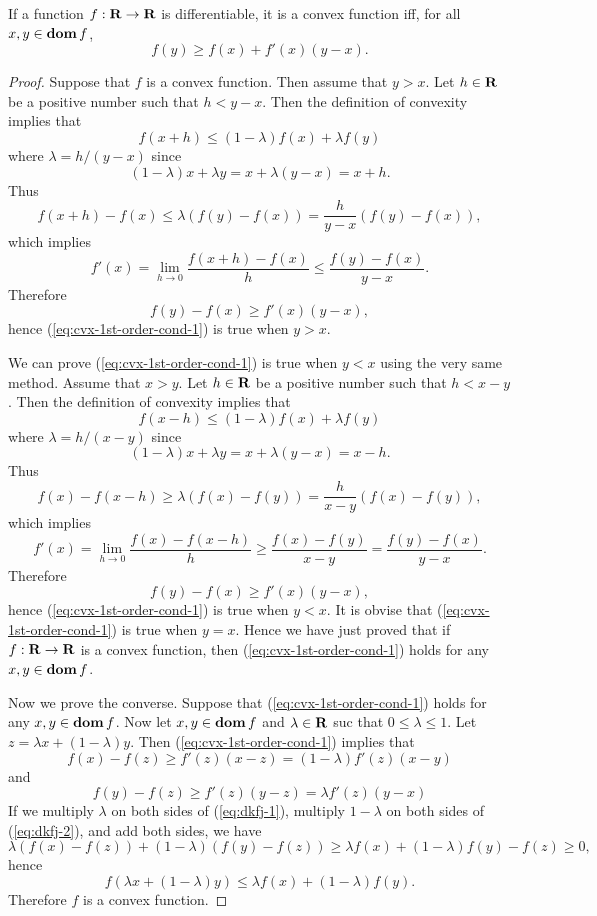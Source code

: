 \documentclass[10pt, twoside]{book}   	%
\begin{document}
\begin{theorem}
\label{theorem:cvx-1st-order-cond-1}
If a function $f:\mathbf{R}\to\mathbf{R}$ is differentiable, it is a convex function iff, for all $x, y \in \mathop{\bf dom} f$,
\begin{equation}
\label{eq:cvx-1st-order-cond-1}
        f(y) \geq f(x) + f'(x) (y-x).
\end{equation}
\end{theorem}

\begin{proof}
Suppose that $f$ is a convex function.
Then assume that $y>x$. Let $h\in\mathbf{R}$ be a positive number such that $h<y-x$. Then the definition of convexity implies that
\[
f(x+h) \leq (1-\lambda) f(x) + \lambda f(y)
\]
where $\lambda = h/(y-x)$ since
\[
(1-\lambda) x + \lambda y = x + \lambda (y-x) = x +h.
\]
Thus
\[
f(x+h) - f (x) \leq \lambda (f(y)-f(x)) = \frac{h}{y-x} (f(y)-f(x)),
\]
which implies
\[
f'(x) = \lim_{h\to0} \frac{f(x+h) - f (x)}{h} \leq \frac{f(y)-f(x)}{y-x}.
\]
Therefore
\[
f(y) - f(x) \geq f'(x)(y-x),
\]
hence (\ref{eq:cvx-1st-order-cond-1}) is true when $y>x$.

We can prove (\ref{eq:cvx-1st-order-cond-1}) is true when $y<x$ using the very same method.
Assume that $x>y$. Let $h\in\mathbf{R}$ be a positive number such that $h<x-y$. Then the definition of convexity implies that
\[
f(x-h) \leq (1-\lambda) f(x) + \lambda f(y)
\]
where $\lambda = h/(x-y)$ since
\[
(1-\lambda) x + \lambda y = x + \lambda (y-x) = x -h.
\]
Thus
\[
f(x) - f (x-h) \geq \lambda (f(x)-f(y)) = \frac{h}{x-y} (f(x)-f(y)),
\]
which implies
\[
f'(x) = \lim_{h\to0} \frac{f(x) - f (x-h)}{h} \geq \frac{f(x)-f(y)}{x-y}  =\frac{f(y)-f(x)}{y-x}.
\]
Therefore
\[
f(y) - f(x) \geq f'(x)(y-x),
\]
hence (\ref{eq:cvx-1st-order-cond-1}) is true when $y<x$.
It is obvise that (\ref{eq:cvx-1st-order-cond-1}) is true when $y=x$.
Hence we have just proved that if $f:\mathbf{R}\to\mathbf{R}$ is a convex function, then (\ref{eq:cvx-1st-order-cond-1}) holds
for any $x,y\in\mathop{\bf dom} f$.

Now we prove the converse.
Suppose that (\ref{eq:cvx-1st-order-cond-1}) holds for any $x,y\in\mathop{\bf dom} f$.
Now let $x,y\in\mathop{\bf dom} f$ and $\lambda \in \mathbf{R}$ suc that $0\leq \lambda \leq 1$.
Let $z=\lambda x + (1-\lambda) y$. Then (\ref{eq:cvx-1st-order-cond-1}) implies that
\begin{equation}
\label{eq:dkfj-1}
f(x) - f(z) \geq f'(z) (x-z) = (1-\lambda) f'(z) (x-y)
\end{equation}
and
\begin{equation}
\label{eq:dkfj-2}
f(y) - f(z) \geq f'(z) (y-z) = \lambda f'(z) (y-x)
\end{equation}
If we multiply $\lambda$ on both sides of (\ref{eq:dkfj-1}),
multiply $1-\lambda$ on both sides of (\ref{eq:dkfj-2}),
and add both sides, we have
\[
\lambda(f(x) - f(z)) + (1-\lambda) (f(y) - f(z))
\geq \lambda f(x) +(1-\lambda) f(y) - f(z) \geq 0,
\]
hence
\[
f(\lambda x + (1-\lambda) y)
\leq \lambda f(x) + (1-\lambda) f(y).
\]
Therefore $f$ is a convex function.
\end{proof}
\end{document}

